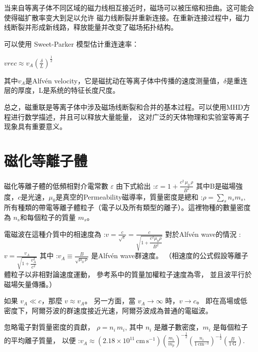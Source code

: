 \documentclass[12pt, a4paper, oneside]{article}
\begin{document}
\begin{spacing}{2.0}
当来自等离子体不同区域的磁力线相互接近时，磁场可以被压缩和扭曲。这可能会使得磁扩散率变大到足以允许
磁力线断裂并重新连接。在重新连接过程中，磁力线断裂并形成新线路，释放能量并改变了磁场拓扑结构。

可以使用 Sweet-Parker 模型估计重连速率：
\begin{center}
    $\displaystyle vrec \approx v_A(\frac{\delta}{L})^{\frac{1}{2}}$
\end{center}

其中$v_A$是Alfvén velocity，它是磁扰动在等离子体中传播的速度测量值，$\delta$是重连层的厚度，L是系统的特征长度尺度。

总之，磁重联是等离子体中涉及磁场线断裂和合并的基本过程。可以使用MHD方程进行数学描述，并且可以释放大量能量，
这对广泛的天体物理和实验室等离子现象具有重要意义。

\section{磁化等離子體}
磁化等離子體的低頻相對介電常數 $\varepsilon$ 由下式給出
:$\displaystyle \varepsilon = 1 + \frac{c^2\,\mu_0\,\rho}{B^2}$
其中B是磁場強度，$c$是光速，$\mu_0$是真空的Permeability磁導率，質量密度是總和
:$ \displaystyle\rho = \sum_s n_s m_s ,$
所有種類的帶電等離子體粒子（電子以及所有類型的離子）。這裡物種的數量密度為 $n_s$和每個粒子的質量 $m_s$。

電磁波在這種介質中的相速度為
:$\displaystyle v = \frac{c}{\sqrt{\varepsilon}} = \frac{c}{\sqrt{1 + \dfrac{c^2 \mu_0 \rho}{B^2}}}$
對於Alfvén wave的情況
:$\displaystyle v = \frac{v_A}{\sqrt{1 + \dfrac{v_A^2}{c^2}}}$
其中
:$\displaystyle v_A \equiv \frac{B}{\sqrt{\mu_0\,\rho}}$
是Alfvén wave群速度。
（相速度的公式假設等離子體粒子以非相對論速度運動，
參考系中的質量加權粒子速度為零，
並且波平行於磁場矢量傳播。）

如果 $\displaystyle v_A \ll c$，那麼 $v \approx v_A$。
另一方面，當 $\displaystyle v_A \to \infty$ 時，$v \to c$。 即在高場或低密度下，阿爾芬波的群速度接近光速，阿爾芬波成為普通的電磁波。

忽略電子對質量密度的貢獻，
$\rho = n_i\,m_i$,
其中 $n_i$ 是離子數密度，$m_i$ 是每個粒子的平均離子質量，
以便
:$\displaystyle v_A \approx \left(2.18 \times 10^{11}\,\text{cm}\,\text{s}^{-1}\right) \left(\frac{m_i}{m_p}\right)^{-\frac{1}{2}} \left(\frac{n_i}{1~\text{cm}^{-3}}\right)^{-\frac{1}{2} } \left(\frac{B}{1~\text{G}}\right).$













\end{spacing}{}


\end{document}
